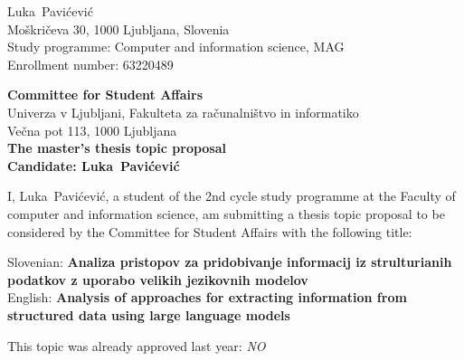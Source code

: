 \documentclass[a4paper, 12pt]{article}
\begin{document}
\newcommand{\ImeKandidata}{Luka} %
\newcommand{\PriimekKandidata}{Pavićević} %
\newcommand{\VpisnaStevilka}{63220489   } %
\newcommand{\StudyProgramme}{Computer and information science, MAG} %
\newcommand{\NaslovBivalisca}{ Moškričeva 30, 1000 Ljubljana, Slovenia } %
\newcommand{\SLONaslov}{Analiza pristopov za pridobivanje informacij iz strulturianih podatkov z uporabo velikih jezikovnih modelov} %
\newcommand{\ENGNaslov}{Analysis of approaches for extracting information from structured data using large language models} %


\newcommand{\ProblemParagraph}{\noindent\textbf{Problem \& State of the Art.} }
\newcommand{\ContributionsParagraph}{\noindent\textbf{Expected Contributions / Technical outcome. } }
\newcommand{\MethodologyParagraph}{\noindent\textbf{Methodology \& Validation. } }

\newcommand{\Kandidat}{\ImeKandidata~\PriimekKandidata}
\noindent
\Kandidat\\
\NaslovBivalisca \\
Study programme: \StudyProgramme \\
Enrollment number: \VpisnaStevilka
\bigskip

{\bf Committee for Student Affairs}\\
Univerza v Ljubljani, Fakulteta za računalništvo in informatiko\\
Večna pot 113, 1000 Ljubljana\\

{\Large\bf
{\centering
    The master’s thesis topic proposal \\%
\large Candidate: \Kandidat \\[10mm]}}


I, \Kandidat, a student of the 2nd cycle study programme at the Faculty of computer and information science, am submitting a thesis topic proposal to be considered by the Committee for Student Affairs with the following title:

Slovenian: {\bf \SLONaslov}\\
English: {\bf \ENGNaslov}

This topic was already approved last year: \textit{NO} 
 
\end{document}
